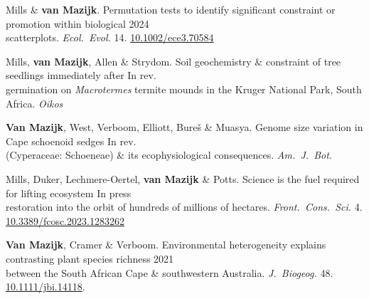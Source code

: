 

Mills \& \textbf{van Mazijk}.
Permutation tests to identify significant constraint or promotion within biological \hfill 2024 \\
\hspace{2em} scatterplots.
  \textit{Ecol.~Evol.}
  14. \href{http://dx.doi.org/10.1002/ece3.70584}{10.1002/ece3.70584}

Mills, \textbf{van Mazijk}, Allen \& Strydom.
Soil geochemistry \& constraint of tree seedlings immediately after
                                                              \hfill In rev. \\
\hspace{2em} germination on \textit{Macrotermes} termite
  mounds in the Kruger National Park, South Africa.
  \textit{Oikos}

\textbf{Van Mazijk}, West, Verboom, Elliott, Bureš \& Muasya.
Genome size variation in Cape schoenoid sedges                \hfill In rev. \\
\hspace{2em} (Cyperaceae: Schoeneae) \& its ecophysiological consequences.
  \textit{Am.~J.~Bot.}

Mills, Duker, Lechmere-Oertel, \textbf{van Mazijk} \& Potts.
Science is the fuel required for lifting ecosystem             \hfill In press \\
\hspace{2em} restoration into the orbit of hundreds of millions of hectares.
  \textit{Front.~Cons.~Sci.}
  4. \\
  \hspace{2em} \href{https://doi.org/10.3389/fcosc.2023.1283262}{10.3389/fcosc.2023.1283262}

\textbf{Van Mazijk}, Cramer \& Verboom.
Environmental heterogeneity explains contrasting plant species richness
                                                                  \hfill 2021 \\
\hspace{2em}
  between the South African Cape \& southwestern Australia.
  \textit{J.~Biogeog.}
  48. \href{https://doi.org/10.1111/jbi.14118}{10.1111/jbi.14118}.

